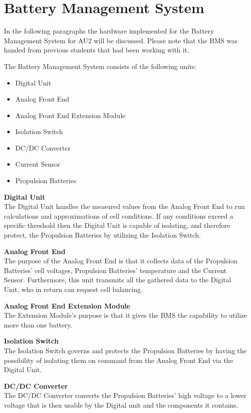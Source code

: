 \section{Battery Management System}
In the following paragraphs the hardware implemented for the Battery Management System for AU2 will be discussed. Please note that the BMS was handed from previous students that had been working with it.

The Battery Management System consists of the following units:
\begin{itemize}
	\item{Digital Unit}
	\item{Analog Front End}
	\item{Analog Front End Extension Module}
	\item{Isolation Switch}
	\item{DC/DC Converter}
	\item{Current Sensor}
	\item{Propulsion Batteries}
\end{itemize}

\textbf{Digital Unit}\\
The Digital Unit handles the measured values from the Analog Front End to run calculations and approximations of cell conditions. If any conditions exceed a specific threshold then the Digital Unit is capable of isolating, and therefore protect, the Propulsion Batteries by utilizing the Isolation Switch.

\textbf{Analog Front End}\\
The purpose of the Analog Front End is that it collects data of the Propulsion Batteries' cell voltages, Propulsion Batteries' temperature and the Current Sensor. Furthermore, this unit transmits all the gathered data to the Digital Unit, who in return can request cell balancing. 

\textbf{Analog Front End Extension Module}\\
The Extension Module's purpose is that it gives the BMS the capability to utilize more than one battery.

\textbf{Isolation Switch}\\
The Isolation Switch governs and protects the Propulsion Batteries by having the possibility of isolating them on command from the Analog Front End via the Digital Unit. 

\textbf{DC/DC Converter}\\
The DC/DC Converter converts the Propulsion Batteries' high voltage to a lower voltage that is then usable by the Digital unit and the components it contains.

